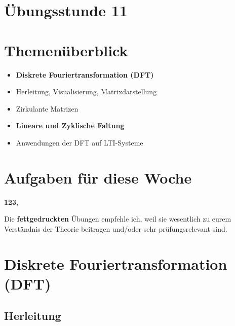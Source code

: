 \documentclass[11pt]{article}
\begin{document}
\thispagestyle{firstpage}

\setlength{\headheight}{1 \baselineskip}  %
\setlength{\parindent}{0pt}  %
\setlength{\parskip}{\baselineskip}  %

\vspace*{-5px}
\section*{Übungsstunde 11}

\section*{Themenüberblick}
\begin{itemize}
    \item \textbf{Diskrete Fouriertransformation (DFT)}
    \item[] Herleitung, Visualisierung, Matrixdarstellung
    \item[] Zirkulante Matrizen
    \item \textbf{Lineare und Zyklische Faltung}
    \item[] Anwendungen der DFT auf LTI-Systeme
\end{itemize}

\section*{Aufgaben für diese Woche}
\vspace{-0.5cm}

\textbf{123}, \\
\vspace{-0.5cm}

Die \textbf{fettgedruckten} Übungen empfehle ich, weil sie wesentlich zu eurem Verständnis der Theorie beitragen und/oder sehr prüfungsrelevant sind.

\vfill \null
\pagebreak

\section*{Diskrete Fouriertransformation (DFT)}
\vspace*{-0.5cm}
\subsection*{Herleitung}
\vspace*{-0.5cm}
%
\end{document}
